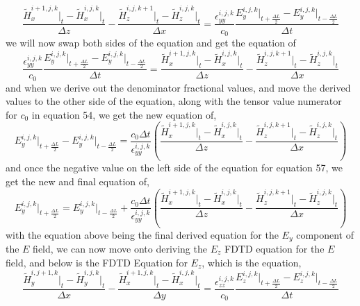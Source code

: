 \documentclass[]{article}
\begin{document}
\begin{equation}
\frac{\tilde{H}_{x}^{i+1, j , k} \Big|_t - \tilde{H}_{x}^{i,j,k}\Big|_t}{\Delta{z}} - \frac{\tilde{H}_{z}^{i, j, k + 1} \Big|_t - \tilde{H}_{z}^{i,j,k}\Big|_t}{\Delta{x}} = \frac{\epsilon_{yy}^{i,j,k}}{c_0} \frac{{E}_{y}^{i,j,k}\Big|_{t+\frac{\Delta{L}}{2}} -E_{y}^{i,j,k}\Big|_{t - \frac{\Delta{L}}{2}}}{\Delta{t}}
\end{equation}
we will now swap both sides of the equation and get the equation of
\begin{equation}
\frac{\epsilon_{yy}^{i,j,k}}{c_0} \frac{{E}_{y}^{i,j,k}\Big|_{t+\frac{\Delta{L}}{2}} -E_{y}^{i,j,k}\Big|_{t - \frac{\Delta{L}}{2}}}{\Delta{t}} = \frac{\tilde{H}_{x}^{i+1, j , k} \Big|_t - \tilde{H}_{x}^{i,j,k}\Big|_t}{\Delta{z}} - \frac{\tilde{H}_{z}^{i, j, k + 1} \Big|_t - \tilde{H}_{z}^{i,j,k}\Big|_t}{\Delta{x}} 
\end{equation}
and when we derive out the denominator fractional values, and move the derived values to the other side of the equation, along with the tensor value numerator for $c_0$ in equation 54, we get the new equation of,
\begin{equation}
{E}_{y}^{i,j,k}\Big|_{t+\frac{\Delta{L}}{2}} -E_{y}^{i,j,k}\Big|_{t - \frac{\Delta{L}}{2}} = \frac{c_0\Delta{t}}{\epsilon_{yy}^{i,j,k}} \left(\frac{\tilde{H}_{x}^{i+1, j , k} \Big|_t - \tilde{H}_{x}^{i,j,k}\Big|_t}{\Delta{z}} - \frac{\tilde{H}_{z}^{i, j, k + 1} \Big|_t - \tilde{H}_{z}^{i,j,k}\Big|_t}{\Delta{x}}\right)
\end{equation}
and once the negative value on the left side of the equation for equation 57, we get the new and final equation of,
\begin{equation}
{E}_{y}^{i,j,k}\Big|_{t+\frac{\Delta{L}}{2}} = E_{y}^{i,j,k}\Big|_{t - \frac{\Delta{L}}{2}} +  \frac{c_0\Delta{t}}{\epsilon_{yy}^{i,j,k}} \left(\frac{\tilde{H}_{x}^{i+1, j , k} \Big|_t - \tilde{H}_{x}^{i,j,k}\Big|_t}{\Delta{z}} - \frac{\tilde{H}_{z}^{i, j, k + 1} \Big|_t - \tilde{H}_{z}^{i,j,k}\Big|_t}{\Delta{x}}\right)
\end{equation}
with the equation above being the final derived equation for the $E_y$ component of the $E$ field, we can now move onto deriving the $E_z$ FDTD equation for the $E$ field, and below is the FDTD Equation for $E_z$, which is the equation,
\begin{equation}
\frac{\tilde{H}_{y}^{i, j + 1 , k} \Big|_t - \tilde{H}_{y}^{i,j,k}\Big|_t}{\Delta{x}} - \frac{\tilde{H}_{x}^{i + 1, j, k} \Big|_t - \tilde{H}_{x}^{i,j,k}\Big|_t}{\Delta{y}} = \frac{\epsilon_{zz}^{i,j,k}}{c_0} \frac{{E}_{z}^{i,j,k}\Big|_{t+\frac{\Delta{L}}{2}} -E_{z}^{i,j,k}\Big|_{t - \frac{\Delta{L}}{2}}}{\Delta{t}}
\end{equation}
\end{document}
